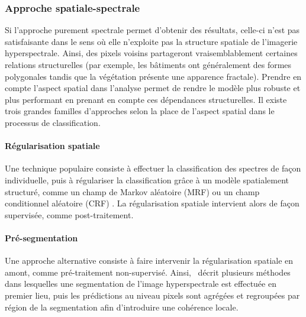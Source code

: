 \subsubsection{Approche spatiale-spectrale}

Si l'approche purement spectrale permet d'obtenir des résultats, celle-ci n'est pas satisfaisante dans le sens où elle n'exploite pas la structure spatiale de l'imagerie hyperspectrale. Ainsi, des pixels voisins partageront vraisemblablement certaines relations structurelles (par exemple, les bâtiments ont généralement des formes polygonales tandis que la végétation présente une apparence fractale). Prendre en compte l'aspect spatial dans l'analyse permet de rendre le modèle plus robuste et plus performant en prenant en compte ces dépendances structurelles. Il existe trois grandes familles d'approches selon la place de l'aspect spatial dans le processus de classification.

\paragraph{Régularisation spatiale} Une technique populaire consiste à effectuer la classification des spectres de façon individuelle, puis à régulariser la classification grâce à un modèle spatialement structuré, comme un champ de Markov aléatoire (MRF) ou un champ conditionnel aléatoire (\gls{CRF}) \cite{wu_semi-supervised_2016}. La régularisation spatiale intervient alors de façon supervisée, comme post-traitement.

\paragraph{Pré-segmentation} Une approche alternative consiste à faire intervenir la régularisation spatiale en amont, comme pré-traitement non-supervisé. Ainsi,~\cite{tarabalka_segmentation_2010,fauvel_advances_2013} décrit plusieurs méthodes dans lesquelles une segmentation de l'image hyperspectrale est effectuée en premier lieu, puis les prédictions au niveau pixels sont agrégées et regroupées par région de la segmentation afin d'introduire une cohérence locale.

